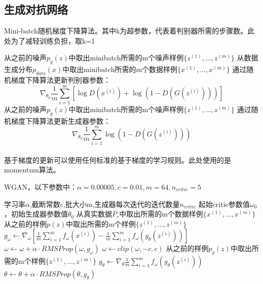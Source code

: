 \documentclass[UTF8]{ctexart}
\begin{document}
\subsection{生成对抗网络}
\begin{algorithm}[htb]  
	\caption{Mini-batch随机梯度下降算法。其中k为超参数，代表着判别器所需的步骤数。此处为了减轻训练负担，取k=1}  
	\begin{algorithmic}[1]  	  
			\State 从之前的噪声$p_g (z)$中取出minibatch所需的m个噪声样例$\{z^{(1)},...,z^{(m)} \}$
			\State 从数据生成分布$p_{data}(x)$中取出minibatch所需的m个数据样例$\{x^{(1)},...,x^{(m)} \}$
			\State 通过随机梯度下降算法更新判别器参数：$$\nabla_{\theta_d} \frac{1}{m} \sum_{i=1}^m [\log D(x^{(i)}) + \log (1-D(G(z^{(i)})))] $$
		\EndFor
		\State 从之前的噪声$p_g (z)$中取出minibatch所需的m个噪声样例$\{z^{(1)},...,z^{(m)} \}$
		\State 通过随机梯度下降算法更新生成器参数：$$\nabla_{\theta_d} \frac{1}{m} \sum_{i=1}^m \log (1-D(G(z^{(i)})))$$
	\EndFor
	\\
	基于梯度的更新可以使用任何标准的基于梯度的学习规则。此处使用的是momentum算法。
    \end{algorithmic}   
\end{algorithm}  

\begin{algorithm}[htb]  
	\caption{WGAN，以下参数中：$\alpha=0.00005,c=0.01,m=64,n_{critic}=5$}  
	\begin{algorithmic}[1]
		\Require  
		学习率$\alpha$,截断常数c,批大小m,生成器每次迭代的迭代数量$n_{critic}$  
	  	\Require  
	  	起始critic参数值$\omega_0$，初始生成器参数值$\theta_0$  	  
			\State 从真实数据$P_r$中取出所需的m个数据样例$\{x^{(1)},...,x^{(m)} \}$
			\State 从之前的样例$p(z)$中取出所需的m个样例$\{z^{(1)},...,z^{(m)} \}$
			\State $g_{\omega} \gets \nabla_\omega [\frac{1}{m}\sum_{i=1}^m f_\omega(x^{(i)})-\frac{1}{m}\sum_{i=1}^m f_\omega(g_\theta (z^{(i)}))]$
			\State $\omega \gets \omega + \alpha \cdot RMSProp(\omega,g_\omega)$
			\State $\omega \gets clip(\omega, -c, c)$
		\EndFor
		\State 从之前的样例$p_g (z)$中取出所需的m个样例$\{z^{(1)},...,z^{(m)} \}$
		\State $g_{\theta} \gets \nabla_\theta \frac{1}{m}\sum_{i=1}^m f_\omega(g_\theta (z^{(i)}))$
		\State $\theta \gets \theta + \alpha \cdot RMSProp(\theta,g_\theta)$
	\EndWhile
	\end{algorithmic}   
\end{algorithm}  
\end{document}
